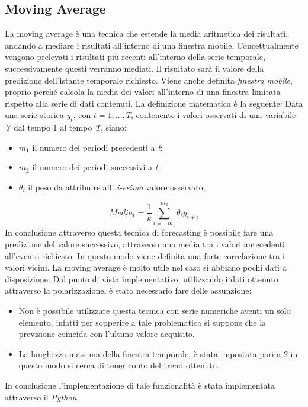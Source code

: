 \subsection{Moving Average}
\label{moving}
La moving average  è una tecnica che estende la media aritmetica dei risultati, andando a mediare i risultati all'interno di una finestra mobile.
Concettualmente vengono prelevati i risultati più recenti all'interno della serie temporale, successivamente questi verranno mediati. Il risultato sarà il valore della predizione dell'istante temporale richiesto.
Viene anche definita \textit{finestra mobile}, proprio perché calcola la media dei valori all'interno di una finestra limitata rispetto alla serie di dati contenuti.
La definizione matematica è la seguente:
Data una serie storica $y_{t}$, con $\textit{t}= 1,...,T$, contenente i valori osservati di una variabile \textit{Y}  dal tempo 1 al tempo \textit{T}, siano:
\begin{itemize}
\item $m_{1}$ il numero dei periodi precedenti a \textit{t};
\item $m_{2}$ il numero dei periodi successivi a \textit{t};
\item $\theta_{i}$ il peso da attribuire all' \textit{i-esimo} valore osservato;
\end{itemize}
\begin{equation}
Media_{t}= \dfrac{1}{k} \sum_{i=-m_{1}}^{m_{2}}\theta_{i}y_{t+i}
\end{equation}
In conclusione attraverso questa tecnica di forecasting è possibile fare una predizione del valore successivo, attraverso una media tra i valori antecedenti all'evento richiesto. In questo modo viene definita una forte correlazione tra i valori vicini. La moving average è molto utile nel caso si abbiano pochi dati a disposizione.
Dal punto di vista implementativo, utilizzando i dati ottenuto attraverso la polarizzazione, è stato necessario fare delle assunzione:
\begin{itemize}
\item Non è possibile utilizzare questa tecnica con serie numeriche aventi un solo elemento, infatti per sopperire a tale problematica si suppone che la previsione coincida con l'ultimo valore acquisito.
\item La lunghezza massima della finestra temporale, è stata impostata pari a 2 in questo modo si cerca di tener conto del trend ottenuto.
\end{itemize}
In conclusione l'implementazione di tale funzionalità è stata implementata attraverso il \textit{Python}.
